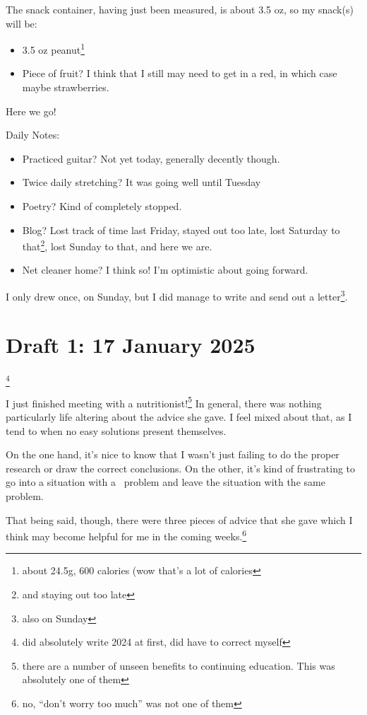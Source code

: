 \documentclass[12pt]{article}[titlepage]
\newcommand{\say}[1]{``#1''}
\renewcommand{\,}{\textsuperscript{,}}
\begin{document}
The snack container, having just been measured, is about 3.5 oz, so my snack(s) will be:  
\begin{itemize}  
\item 3.5 oz peanut\footnote{about 24.5g, 600 calories (wow that's a lot of calories}  
\item Piece of fruit? I think that I still may need to get in a red, in which case maybe strawberries.  
\end{itemize}  
Here we go!

Daily Notes:

\begin{itemize}  
\item Practiced guitar? Not yet today, generally decently though.  
\item Twice daily stretching? It was going well until Tuesday  
\item Poetry? Kind of completely stopped.  
\item Blog? Lost track of time last Friday, stayed out too late, lost Saturday to that\footnote{and staying out too late}, lost Sunday to that, and here we are.  
\item Net cleaner home? I think so! I'm optimistic about going forward.  
\end{itemize}  
I only drew once, on Sunday, but I did manage to write and send out a letter\footnote{also on Sunday}.  


\section{Draft 1: 17 January 2025}\footnote{did absolutely write 2024 at first, did have to correct myself}

I just finished meeting with a nutritionist!\footnote{there are a number of unseen benefits to continuing education. This was absolutely one of them}  
In general, there was nothing particularly life altering about the advice she gave.  
I feel mixed about that, as I tend to when no easy solutions present themselves.

On the one hand, it's nice to know that I wasn't just failing to do the proper research or draw the correct conclusions.  
On the other, it's kind of frustrating to go into a situation with a  problem and leave the situation with the same problem.

That being said, though, there were three pieces of advice that she gave which I think may become helpful for me in the coming weeks.\footnote{no, \say{don't worry too much} was not one of them}
\end{document}
